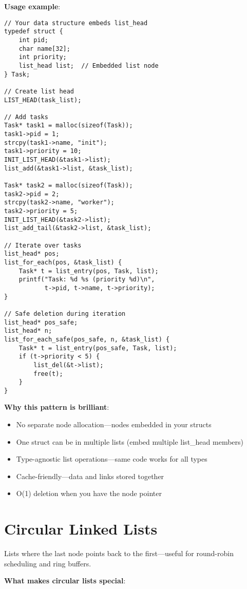 \textbf{Usage example}:

\begin{lstlisting}
// Your data structure embeds list_head
typedef struct {
    int pid;
    char name[32];
    int priority;
    list_head list;  // Embedded list node
} Task;

// Create list head
LIST_HEAD(task_list);

// Add tasks
Task* task1 = malloc(sizeof(Task));
task1->pid = 1;
strcpy(task1->name, "init");
task1->priority = 10;
INIT_LIST_HEAD(&task1->list);
list_add(&task1->list, &task_list);

Task* task2 = malloc(sizeof(Task));
task2->pid = 2;
strcpy(task2->name, "worker");
task2->priority = 5;
INIT_LIST_HEAD(&task2->list);
list_add_tail(&task2->list, &task_list);

// Iterate over tasks
list_head* pos;
list_for_each(pos, &task_list) {
    Task* t = list_entry(pos, Task, list);
    printf("Task: %d %s (priority %d)\n",
           t->pid, t->name, t->priority);
}

// Safe deletion during iteration
list_head* pos_safe;
list_head* n;
list_for_each_safe(pos_safe, n, &task_list) {
    Task* t = list_entry(pos_safe, Task, list);
    if (t->priority < 5) {
        list_del(&t->list);
        free(t);
    }
}
\end{lstlisting}

\textbf{Why this pattern is brilliant}:

\begin{itemize}
    \item No separate node allocation---nodes embedded in your structs
    \item One struct can be in multiple lists (embed multiple list\_head members)
    \item Type-agnostic list operations---same code works for all types
    \item Cache-friendly---data and links stored together
    \item O(1) deletion when you have the node pointer
\end{itemize}

\section{Circular Linked Lists}

Lists where the last node points back to the first---useful for round-robin scheduling and ring buffers.

\textbf{What makes circular lists special}:

